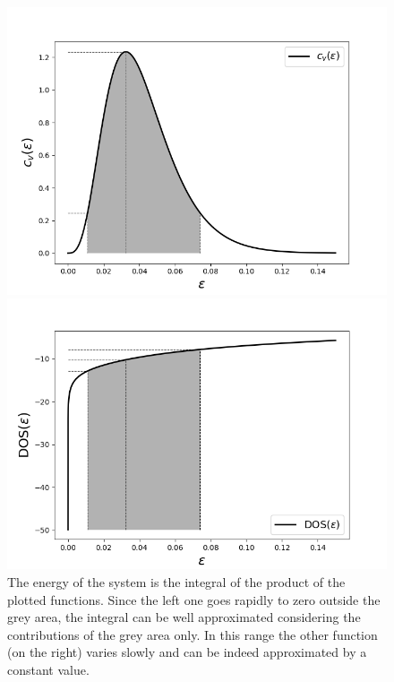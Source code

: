 \documentclass{article}
\begin{document}
\begin{figure}[htp]
\centering
\begin{minipage}{0.4\textwidth}
    \includegraphics[scale=0.45]{scripts/cv_eps.png}
\end{minipage}
\hfill
\begin{minipage}{0.45\textwidth}
    \includegraphics[scale=0.45]{scripts/DOS_eps.png}
\end{minipage}
\caption{The energy of the system is the integral of the product of the plotted functions. Since the left one goes rapidly to zero
outside the grey area, the integral can be well approximated considering the contributions of the grey area only. In this range the other function (on the right) varies
slowly and can be indeed approximated by a constant value.}
\label{fig:peak}
\end{figure}
\end{document}

